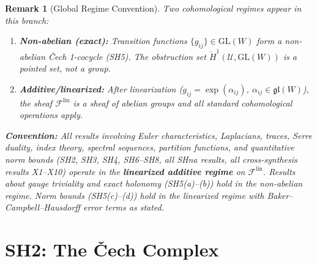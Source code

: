 \documentclass[11pt,letterpaper]{article}
\newtheorem{remark}[conjecture]{Remark}
\newcommand{\Hcech}{\check{H}}
\newcommand{\sheaf}{\mathcal{F}}
\newcommand{\cover}{\mathcal{U}}
\begin{document}
\begin{remark}[Global Regime Convention]\label{rem:regime}
Two cohomological regimes appear in this branch:
\begin{enumerate}
    \item \textbf{Non-abelian (exact):} Transition functions 
    $\{g_{ij}\} \in \mathrm{GL}(W)$ form a non-abelian \v{C}ech 
    1-cocycle (SH5). The obstruction set 
    $\Hcech^1(\cover, \mathrm{GL}(W))$ is a \emph{pointed set}, 
    not a group.
    \item \textbf{Additive/linearized:} After linearization 
    ($g_{ij} = \exp(\alpha_{ij})$, $\alpha_{ij} \in 
    \mathfrak{gl}(W)$), the sheaf $\sheaf^{\mathrm{lin}}$ is a sheaf 
    of abelian groups and all standard cohomological operations apply.
\end{enumerate}
\textbf{Convention:} All results involving Euler characteristics, 
Laplacians, traces, Serre duality, index theory, spectral sequences, 
partition functions, and quantitative norm bounds (SH2, SH3, SH4, 
SH6--SH8, all SHna results, all cross-synthesis results X1--X10) 
operate in the \textbf{linearized additive regime} on 
$\sheaf^{\mathrm{lin}}$. Results about gauge triviality and exact 
holonomy (SH5(a)--(b)) hold in the non-abelian regime. Norm bounds 
(SH5(c)--(d)) hold in the linearized regime with 
Baker--Campbell--Hausdorff error terms as stated.
\end{remark}

\section{SH2: The \v{C}ech Complex}
\end{document}
